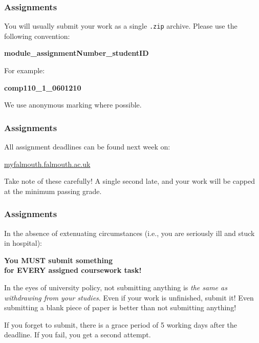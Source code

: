 \begin{frame}
	\frametitle{Assignments}
	
	You will usually submit your work as a single \texttt{.zip} archive. Please use the following convention:
	
	\begin{large}
		\begin{center}
			\textbf{module\_assignmentNumber\_studentID}
		\end{center}
	\end{large}
	
	For example:
	
	\begin{Large}
		\begin{center}
			\textbf{comp110\_1\_0601210}
		\end{center}
	\end{Large}
	
	\vspace{1em}
	
	We use anonymous marking where possible.

\end{frame}

\begin{frame}
	\frametitle{Assignments}
		
	All assignment deadlines can be found next week on:
	
	\vspace{1em}
	
	\indent \url{myfalmouth.falmouth.ac.uk}
	
	\vspace{1em}
	
	Take note of these carefully! A single second late, and your work will be capped at the minimum passing grade.
	
\end{frame}

\begin{frame}
	\frametitle{Assignments}
		
	In the absence of extenuating circumstances (i.e., you are seriously ill and stuck in hospital):
	
	\begin{Large}
		\begin{center}
			\textbf{You MUST submit something \\ for EVERY assigned coursework task!}
		\end{center}
	\end{Large}
	
	In the eyes of university policy, not submitting anything is \textit{the same as withdrawing from your studies}. Even if your work is unfinished, submit it! Even submitting a blank piece of paper is better than not submitting anything! 
	
		\vspace{0.5em}
	
	If you forget to submit, there is a grace period of 5 working days after the deadline. If you fail, you get a second attempt.
	
\end{frame}


